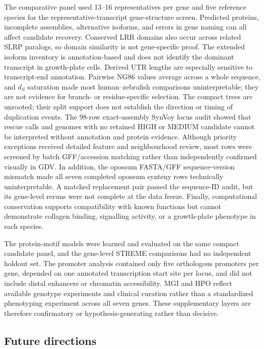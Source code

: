The comparative panel used 13--16 representatives per gene and
five reference species for the representative-transcript gene-structure screen.
Predicted proteins, incomplete assemblies, alternative isoforms, and errors in
gene naming can all affect candidate recovery. Conserved LRR domains also occur
across related SLRP paralogs, so domain similarity is not gene-specific proof.
The extended isoform inventory is annotation-based and does not identify the
dominant transcript in growth-plate cells. Derived UTR lengths are especially
sensitive to transcript-end annotation. Pairwise NG86 values average across a
whole sequence, and $d_S$ saturation made most human--zebrafish comparisons
uninterpretable; they are not evidence for branch- or residue-specific
selection.
The compact trees are unrooted; their split support does not establish the
direction or timing of duplication events. The 98-row exact-assembly SynVoy
locus audit showed that rescue calls and genomes with no retained HIGH or
MEDIUM candidate cannot be interpreted without annotation and protein
evidence. Although priority exceptions received detailed feature and
neighbourhood review, most rows were screened by batch GFF/accession matching
rather than independently confirmed visually in GDV. In addition, the
opossum FASTA/GFF sequence-version mismatch made all seven completed opossum
synteny rows technically uninterpretable. A matched replacement pair passed
the sequence-ID audit, but its gene-level reruns were not complete at the data
freeze. Finally, computational conservation
supports compatibility with known functions but cannot demonstrate collagen
binding, signalling activity, or a growth-plate phenotype in each species.

The protein-motif models were learned and evaluated on the same compact
candidate panel, and the gene-level STREME comparisons had no independent
holdout set. The promoter analysis contained only five orthologous promoters per
gene, depended on one annotated transcription start site per locus, and did not
include distal enhancers or chromatin accessibility. MGI and HPO reflect
available genotype experiments and clinical curation rather than a standardized
phenotyping experiment across all seven genes. These supplementary layers are
therefore confirmatory or hypothesis-generating rather than decisive.

\subsection{Future directions}
\label{subsec:discussion-future-directions}

